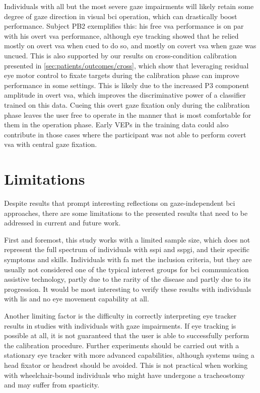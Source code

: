 Individuals with all but the most severe gaze impairments will likely retain
some degree of gaze direction in visual \ac{bci} operation, which can
drastically boost performance.
Subject PB2 exemplifies this: his free \ac{vsa} performance is on par with his
overt \ac{vsa} performance, although eye tracking showed that he relied mostly
on overt \ac{vsa} when cued to do so, and mostly on covert \ac{vsa} when
gaze was uncued.
This is also supported by our results on cross-condition calibration presented
in \cref{sec:patients/outcomes/cross}, which show that leveraging residual
eye motor control to fixate targets during the calibration phase can improve
performance in some settings.
This is likely due to the increased P3 component amplitude in overt \ac{vsa},
which improves the discriminative power of a classifier trained on this data.
Cueing this overt gaze fixation only during the calibration phase leaves the user
free to operate in the manner that is most comfortable for them in the
operation phase.
Early VEPs in the training data could also contribute in those cases where the participant was not
able to perform covert \ac{vsa} with central gaze fixation.

\section{Limitations}

Despite results that prompt interesting reflections on gaze-independent \ac{bci} approaches,
there are some limitations to the presented results that need to be
addressed in current and future work.

First and foremost, this study works with a limited sample size, which
does not represent the full spectrum of individuals with \ac{sspi} and
\ac{sspgi}, and their specific symptoms and skills.
Individuals with \ac{fa} met the inclusion criteria, but they are usually not
considered one of the typical interest groups for \ac{bci} communication assistive
technology, partly due to the rarity of the disease and partly due to its
progression.
It would be most interesting to verify these results with individuals with
\ac{lis} and no eye movement capability at all.

Another limiting factor is the difficulty in correctly interpreting eye
tracker results in studies with individuals with gaze impairments.
If eye tracking is possible at all, it is not guaranteed that the user is able
to successfully perform the calibration procedure.
Further experiments should be carried out with a stationary eye tracker with
more advanced capabilities, although systems using a head fixator or headrest
should be avoided.
This is not practical when working with
wheelchair-bound individuals who might have undergone a tracheostomy and may
suffer from spasticity.

